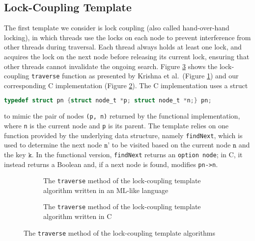 \documentclass[a4paper,UKenglish,cleveref, autoref, thm-restate]{lipics-v2021}
\begin{document}
\subsection{Lock-Coupling Template}
\label{lock-coupling-algo}

The first template we consider is lock coupling (also called hand-over-hand locking), in which threads use the locks on each node to prevent interference from other threads during traversal. Each thread always holds at least one lock, and acquires the lock on the next node before releasing its current lock, ensuring that other threads cannot invalidate the ongoing search.
Figure \ref{traverse_lock} shows the lock-coupling \lstinline{traverse} function as presented by Krishna et al.~(Figure \ref{traverse_lock_a}) and our corresponding C implementation (Figure \ref{traverse_lock_b}). The C implementation uses a struct
\begin{lstlisting}[language = C, backgroundcolor=\color{white}, basicstyle=\ttfamily\footnotesize]
	typedef struct pn {struct node_t *p; struct node_t *n;} pn;
\end{lstlisting}
to mimic the pair of nodes \lstinline{(p, n)} returned by the functional implementation, where \lstinline{n} is the current node and \lstinline{p} is its parent. The template relies on one function provided by the underlying data structure, namely \lstinline{findNext}, which is used to determine the next node $\texttt{n'}$ to be visited based on the current node $\texttt{n}$ and the key $\texttt{k}$. In the functional version, \lstinline{findNext} returns an \lstinline{option node}; in C, it instead returns a Boolean and, if a next node is found, modifies \lstinline{pn->n}.


\begin{figure}[h]
	\begin{subfigure}[t]{0.45\textwidth}
		 
		\caption{The \lstinline{traverse} method of the lock-coupling template algorithm written in an ML-like language \cite{krishna2019compositional}} 
		\label{traverse_lock_a}	
	\end{subfigure}\qquad
	\begin{subfigure}[t]{0.48\textwidth}
		 
		\caption{The \lstinline{traverse} method of the lock-coupling template algorithm written in C}
		\label{traverse_lock_b}
	\end{subfigure}
	\caption{The \lstinline{traverse} method of the lock-coupling template algorithms}
	\label{traverse_lock}
\end{figure}
\end{document}
